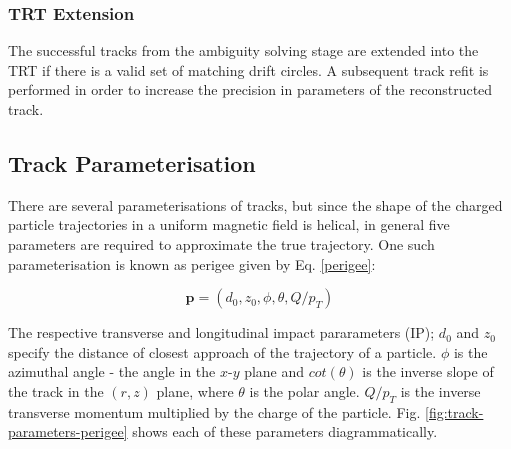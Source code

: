 \subsubsection{TRT Extension}

The successful tracks from the ambiguity solving stage are extended into the TRT if there is a valid set of matching drift circles. A subsequent track refit is performed in order to increase the precision in parameters of the reconstructed track.


\subsection{Track Parameterisation}
\label{track-parameterisation}

There are several parameterisations of tracks, but since the shape of the charged particle trajectories in a uniform magnetic field is helical, in general five parameters are required to approximate the true trajectory. One such parameterisation is known as perigee given by Eq. \ref{perigee}:

\begin{equation}\label{perigee}
\textbf{p} = (d_0, z_0, \phi, \theta, Q/p_T)
\end{equation}

The respective transverse and longitudinal impact pararameters (IP); $d_0$ and $z_0$ specify the distance of closest approach of the trajectory of a particle. $\phi$ is the azimuthal angle - the angle in the $x$-$y$ plane and $cot(\theta)$ is the inverse slope of the track in the $(r,z)$ plane, where $\theta$ is the polar angle. $Q/p_T$ is the inverse transverse momentum multiplied by the charge of the particle. Fig. \ref{fig:track-parameters-perigee} shows each of these parameters diagrammatically.


